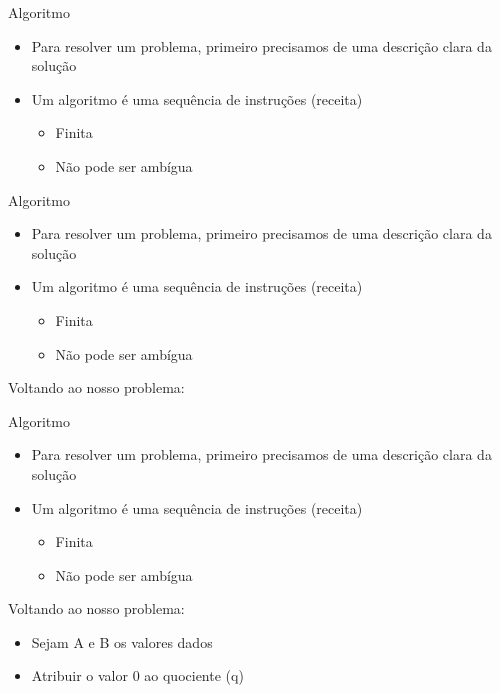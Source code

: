 \documentclass[t, aspectratio=169]{beamer}
\begin{document}
\begin{frame}[label={sec:orgc198678}]{Algoritmo}
\begin{itemize}
\item Para resolver um problema, primeiro precisamos de uma descrição clara da solução
\item Um algoritmo é uma sequência de instruções (receita)
\begin{itemize}
\item Finita
\item Não pode ser ambígua
\end{itemize}
\end{itemize}
\end{frame}

\begin{frame}[label={sec:org014e9fa}]{Algoritmo}
\begin{itemize}
\item Para resolver um problema, primeiro precisamos de uma descrição clara da solução
\item Um algoritmo é uma sequência de instruções (receita)
\begin{itemize}
\item Finita
\item Não pode ser ambígua
\end{itemize}
\end{itemize}

\alert{Voltando ao nosso problema:}
\end{frame}

\begin{frame}[label={sec:org5f8261a}]{Algoritmo}
\begin{itemize}
\item Para resolver um problema, primeiro precisamos de uma descrição clara da solução
\item Um algoritmo é uma sequência de instruções (receita)
\begin{itemize}
\item Finita
\item Não pode ser ambígua
\end{itemize}
\end{itemize}

\alert{Voltando ao nosso problema:}

\begin{itemize}
\item Sejam A e B os valores dados
\item Atribuir o valor 0 ao quociente (q)
\end{itemize}
\end{frame}
\end{document}
